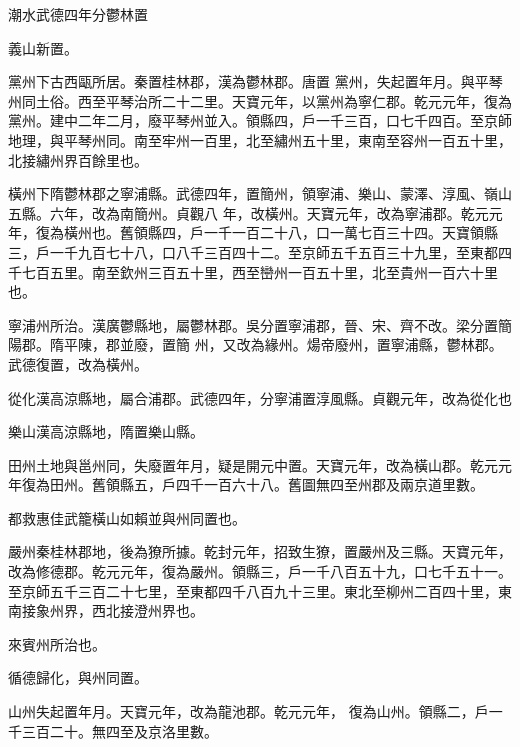 \begin{pinyinscope}
 潮水武德四年分鬱林置



 義山新置。



 黨州下古西甌所居。秦置桂林郡，漢為鬱林郡。唐置
 黨州，失起置年月。與平琴州同土俗。西至平琴治所二十二里。天寶元年，以黨州為寧仁郡。乾元元年，復為黨州。建中二年二月，廢平琴州並入。領縣四，戶一千三百，口七千四百。至京師地理，與平琴州同。南至牢州一百里，北至繡州五十里，東南至容州一百五十里，北接繡州界百餘里也。



 橫州下隋鬱林郡之寧浦縣。武德四年，置簡州，領寧浦、樂山、蒙澤、淳風、嶺山五縣。六年，改為南簡州。貞觀八
 年，改橫州。天寶元年，改為寧浦郡。乾元元年，復為橫州也。舊領縣四，戶一千一百二十八，口一萬七百三十四。天寶領縣三，戶一千九百七十八，口八千三百四十二。至京師五千五百三十九里，至東都四千七百五里。南至欽州三百五十里，西至巒州一百五十里，北至貴州一百六十里也。



 寧浦州所治。漢廣鬱縣地，屬鬱林郡。吳分置寧浦郡，晉、宋、齊不改。梁分置簡陽郡。隋平陳，郡並廢，置簡
 州，又改為緣州。煬帝廢州，置寧浦縣，鬱林郡。武德復置，改為橫州。



 從化漢高涼縣地，屬合浦郡。武德四年，分寧浦置淳風縣。貞觀元年，改為從化也



 樂山漢高涼縣地，隋置樂山縣。



 田州土地與邕州同，失廢置年月，疑是開元中置。天寶元年，改為橫山郡。乾元元年復為田州。舊領縣五，戶四千一百六十八。舊圖無四至州郡及兩京道里數。



 都救惠佳武籠橫山如賴並與州同置也。



 嚴州秦桂林郡地，後為獠所據。乾封元年，招致生獠，置嚴州及三縣。天寶元年，改為修德郡。乾元元年，復為嚴州。領縣三，戶一千八百五十九，口七千五十一。至京師五千三百二十七里，至東都四千八百九十三里。東北至柳州二百四十里，東南接象州界，西北接澄州界也。



 來賓州所治也。



 循德歸化，與州同置。



 山州失起置年月。天寶元年，改為龍池郡。乾元元年，
 復為山州。領縣二，戶一千三百二十。無四至及京洛里數。




\end{pinyinscope}
